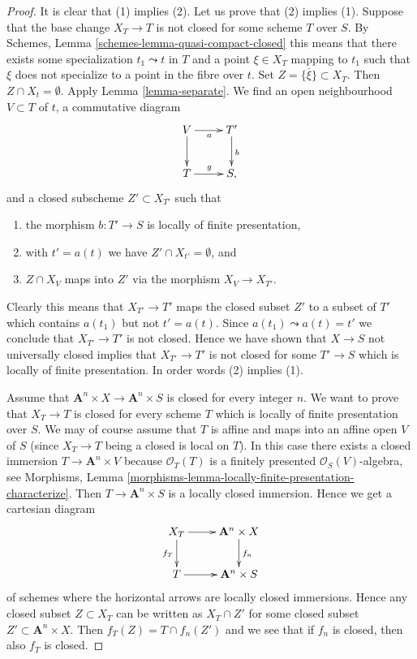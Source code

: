 \documentclass[10pt,a4paper]{amsart}
\theoremstyle{plain}
\theoremstyle{definition}
\theoremstyle{remark}
\numberwithin{equation}{subsection}
\begin{document}
\begin{proof}
It is clear that (1) implies (2). Let us prove that (2) implies (1).
Suppose that the base change $X_T \to T$ is not closed for some
scheme $T$ over $S$. By
Schemes, Lemma \ref{schemes-lemma-quasi-compact-closed}
this means that there exists some specialization $t_1 \leadsto t$ in
$T$ and a point $\xi \in X_T$ mapping to $t_1$ such that $\xi$ does not
specialize to a point in the fibre over $t$. Set
$Z = \overline{\{\xi\}} \subset X_T$. Then $Z \cap X_t = \emptyset$. Apply
Lemma \ref{lemma-separate}.
We find an open neighbourhood $V \subset T$ of $t$, a commutative diagram
$$
\xymatrix{
V \ar[d] \ar[r]_a & T' \ar[d]^b \\
T \ar[r]^g & S,
}
$$
and a closed subscheme $Z' \subset X_{T'}$ such that
\begin{enumerate}
\item the morphism $b : T' \to S$ is locally of finite presentation,
\item with $t' = a(t)$ we have $Z' \cap X_{t'} = \emptyset$, and
\item $Z \cap X_V$ maps into $Z'$ via the morphism $X_V \to X_{T'}$.
\end{enumerate}
Clearly this means that $X_{T'} \to T'$ maps the closed subset $Z'$
to a subset of $T'$ which contains $a(t_1)$ but not $t' = a(t)$.
Since $a(t_1) \leadsto a(t) = t'$ we conclude that $X_{T'} \to T'$
is not closed. Hence we have shown that $X \to S$ not universally closed
implies that $X_{T'} \to T'$ is not closed for some $T' \to S$
which is locally of finite presentation. In order words (2)
implies (1).

\medskip\noindent
Assume that $\mathbf{A}^n \times X \to \mathbf{A}^n \times S$ is
closed for every integer $n$. We want to prove that $X_T \to T$ is
closed for every scheme $T$ which is locally of finite presentation
over $S$. We may of course assume that $T$ is affine and maps into
an affine open $V$ of $S$ (since $X_T \to T$ being a closed is local on $T$).
In this case there exists a closed immersion $T \to \mathbf{A}^n \times V$
because $\mathcal{O}_T(T)$ is a finitely presented
$\mathcal{O}_S(V)$-algebra, see
Morphisms,
Lemma \ref{morphisms-lemma-locally-finite-presentation-characterize}.
Then $T \to \mathbf{A}^n \times S$ is a locally closed immersion.
Hence we get a cartesian diagram
$$
\xymatrix{
X_T \ar[d]_{f_T} \ar[r] & \mathbf{A}^n \times X \ar[d]^{f_n} \\
T \ar[r] & \mathbf{A}^n \times S
}
$$
of schemes where the horizontal arrows are locally closed immersions.
Hence any closed subset $Z \subset X_T$ can be written as
$X_T \cap Z'$ for some closed subset $Z' \subset \mathbf{A}^n \times X$.
Then $f_T(Z) = T \cap f_n(Z')$ and we see that if $f_n$ is closed, then
also $f_T$ is closed.
\end{proof}
\end{document}

